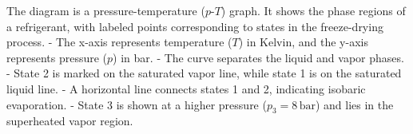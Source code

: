 The diagram is a pressure-temperature (\(p\)-\(T\)) graph. It shows the phase regions of a refrigerant, with labeled points corresponding to states in the freeze-drying process.  
- The x-axis represents temperature (\(T\)) in Kelvin, and the y-axis represents pressure (\(p\)) in bar.  
- The curve separates the liquid and vapor phases.  
- State 2 is marked on the saturated vapor line, while state 1 is on the saturated liquid line.  
- A horizontal line connects states 1 and 2, indicating isobaric evaporation.  
- State 3 is shown at a higher pressure (\(p_3 = 8 \, \text{bar}\)) and lies in the superheated vapor region.